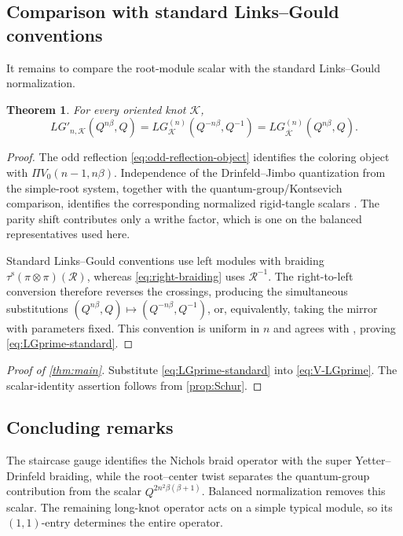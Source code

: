 \documentclass[11pt,a4paper]{article}
\newcommand{\ot}{\otimes}
\newtheorem{theorem}{Theorem}[section]
\theoremstyle{definition}
\theoremstyle{remark}
\begin{document}
\subsection{Comparison with standard Links--Gould conventions}

It remains to compare the root-module scalar with the standard
Links--Gould normalization.

\begin{theorem}\label{thm:standard-comparison}
For every oriented knot \(\mathcal K\),
\begin{equation}\label{eq:LGprime-standard}
 LG'_{n,\mathcal K}(Q^{n\beta},Q)
 =
 LG_{\mathcal K}^{(n)}(Q^{-n\beta},Q^{-1})
 =
 LG_{\overline{\mathcal K}}^{(n)}(Q^{n\beta},Q).
\end{equation}
\end{theorem}

\begin{proof}
The odd reflection \eqref{eq:odd-reflection-object} identifies the
coloring object with \(\Pi V_0(n-1,n\beta)\).  Independence of the
Drinfeld--Jimbo quantization from the simple-root system, together with
the quantum-group/Kontsevich comparison, identifies the corresponding
normalized rigid-tangle scalars \cite{GeerCartan,GeerKontsevich}.
The parity shift contributes only a writhe factor, which is one on the
balanced representatives used here.

Standard Links--Gould conventions use left modules with braiding
\(\tau^{\mathrm s}(\pi\ot\pi)(\mathcal R)\), whereas
\eqref{eq:right-braiding} uses \(\mathcal R^{-1}\).  The right-to-left
conversion therefore reverses the crossings, producing the simultaneous
substitutions \((Q^{n\beta},Q)\mapsto(Q^{-n\beta},Q^{-1})\), or,
equivalently, taking the mirror with parameters fixed.  This convention
is uniform in \(n\) and agrees with
\cite[Theorem~1.5]{ColoredLG}, proving \eqref{eq:LGprime-standard}.
\end{proof}

\begin{proof}[Proof of \cref{thm:main}]
Substitute \eqref{eq:LGprime-standard} into \eqref{eq:V-LGprime}.
The scalar-identity assertion follows from \cref{prop:Schur}.
\end{proof}

\subsection{Concluding remarks}

The staircase gauge identifies the Nichols braid operator with the
super Yetter--Drinfeld braiding, while the root--center twist separates
the quantum-group contribution from the scalar
\(Q^{2n^2\beta(\beta+1)}\).  Balanced normalization removes this scalar.
The remaining long-knot operator acts on a simple typical module, so its
\((1,1)\)-entry determines the entire operator.
\end{document}
